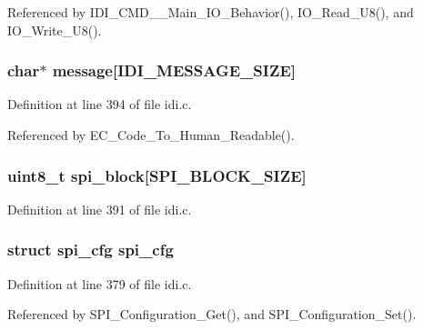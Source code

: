 Referenced by I\+D\+I\+\_\+\+C\+M\+D\+\_\+\+\_\+\+Main\+\_\+\+I\+O\+\_\+\+Behavior(), I\+O\+\_\+\+Read\+\_\+\+U8(), and I\+O\+\_\+\+Write\+\_\+\+U8().

\hypertarget{structidi__dataset_a90f8e8aa30448abeaead3953145c5ce6}{
\subsubsection[{message}]{\setlength{\rightskip}{0pt plus 5cm}char$\ast$ message\mbox{[}{\bf I\+D\+I\+\_\+\+M\+E\+S\+S\+A\+G\+E\+\_\+\+S\+I\+Z\+E}\mbox{]}}}\label{structidi__dataset_a90f8e8aa30448abeaead3953145c5ce6}


Definition at line 394 of file idi.\+c.



Referenced by E\+C\+\_\+\+Code\+\_\+\+To\+\_\+\+Human\+\_\+\+Readable().

\hypertarget{structidi__dataset_a4370ed563af116d0087bdf1285ef35ea}{
\subsubsection[{spi\+\_\+block}]{\setlength{\rightskip}{0pt plus 5cm}uint8\+\_\+t spi\+\_\+block\mbox{[}{\bf S\+P\+I\+\_\+\+B\+L\+O\+C\+K\+\_\+\+S\+I\+Z\+E}\mbox{]}}}\label{structidi__dataset_a4370ed563af116d0087bdf1285ef35ea}


Definition at line 391 of file idi.\+c.

\hypertarget{structidi__dataset_a524ca5c3ea3d76688ccecb7f299f31f4}{
\subsubsection[{spi\+\_\+cfg}]{\setlength{\rightskip}{0pt plus 5cm}struct {\bf spi\+\_\+cfg} {\bf spi\+\_\+cfg}}}\label{structidi__dataset_a524ca5c3ea3d76688ccecb7f299f31f4}


Definition at line 379 of file idi.\+c.



Referenced by S\+P\+I\+\_\+\+Configuration\+\_\+\+Get(), and S\+P\+I\+\_\+\+Configuration\+\_\+\+Set().

